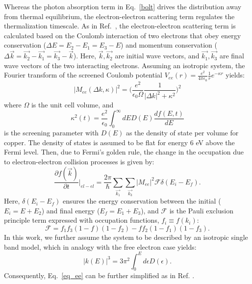 Whereas the photon absorption term in Eq.~\ref{bolt} drives the distribution away from thermal equilibrium, the electron-electron scattering term regulates the thermalization timescale. As in Ref.~\cite{boltzmann}, the electron-electron scattering term is calculated based on the Coulomb interaction of two electrons that obey energy conservation ($\Delta E = E_2 - E_1 = E_3 - E$) and momentum conservation ($\Delta \vec{k} = \vec{k_2} - \vec{k_1} = \vec{k_3} - \vec{k}$).\cite{rethfeld,boltzmann} Here, $\vec{k}, \vec{k_2}$ are initial wave vectors, and $\vec{k_1}, \vec{k_3}$ are final wave vectors of the two interacting electrons. Assuming an isotropic system, the Fourier transform of the screened Coulomb potential $V_{ee}(r) = \frac{e^2}{4 \pi \epsilon_0}\frac{1}{r}e^{-\kappa r}$ yields:\cite{Ashcroft1978,rethfeld}
\begin{equation}\label{eq_m}
	|M_{ee}(\Delta k,\kappa)|^2 = \Big(\frac{e^2}{\epsilon_0 \Omega}\frac{1}{|\Delta k|^2 + \kappa^2}\Big)^2
\end{equation}
where $\Omega$ is the unit cell volume, and
\begin{equation}
	\kappa^2 (t) = \frac{e^2}{\epsilon_0}\int_0^\infty dE D(E) \frac{df(E,t)}{dE}
\end{equation}
is the screening parameter with $D(E)$ as the density of state per volume for copper.\cite{Lin2008} The density of states is assumed to be flat for energy 6 eV above the Fermi level. Then, due to Fermi's golden rule, the change in the occupation due to electron-electron collision processes is given by:\cite{boltzmann,rethfeld}
\begin{equation}\label{eq_ee}
	\frac{\partial f(\vec{k})}{\partial t}\biggr|_{el-el} = \frac{2 \pi}{\hbar}\sum_{\vec{k_1}}\sum_{\vec{k_3}} |M_{ee}|^2 \mathcal{F} \delta(E_i-E_f).
\end{equation}
Here, $\delta(E_i-E_f)$ ensures the energy conservation between the initial ($E_i = E + E_2$) and final energy ($E_f = E_1 + E_3$), and $\mathcal{F}$ is the Pauli exclusion principle term expressed with occupation functions, $f_i \equiv f(k_i)$:\cite{rethfeld,boltzmann,skin}
\begin{equation}
	\mathcal{F} = f_1 f_3 (1-f)(1-f_2) - f f_2(1-f_1)(1-f_3).
\end{equation}
In this work, we further assume the system to be described by an isotropic single band model, which in analogy with the free electron case yields:
\begin{equation}
	|k(E)|^3 = 3\pi^2 \int_0^E d\epsilon D(\epsilon).
\end{equation} 
Consequently, Eq.~\ref{eq_ee} can be further simplified as in Ref. \cite{boltzmann}.

